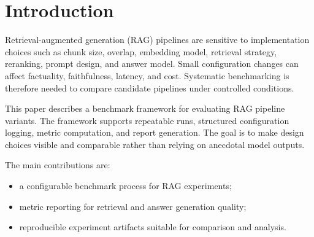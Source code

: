 \section{Introduction}

Retrieval-augmented generation (RAG) pipelines are sensitive to implementation choices such as chunk size, overlap, embedding model, retrieval strategy, reranking, prompt design, and answer model. Small configuration changes can affect factuality, faithfulness, latency, and cost. Systematic benchmarking is therefore needed to compare candidate pipelines under controlled conditions.

This paper describes a benchmark framework for evaluating RAG pipeline variants. The framework supports repeatable runs, structured configuration logging, metric computation, and report generation. The goal is to make design choices visible and comparable rather than relying on anecdotal model outputs.

The main contributions are:
\begin{itemize}
    \item a configurable benchmark process for RAG experiments;
    \item metric reporting for retrieval and answer generation quality;
    \item reproducible experiment artifacts suitable for comparison and analysis.
\end{itemize}
